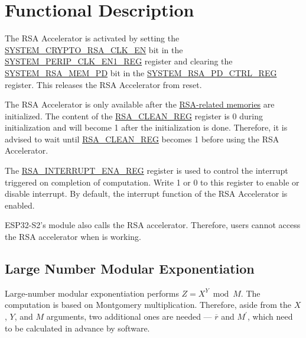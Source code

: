 \documentclass[main\_\_EN.tex]{subfiles}
\begin{document}
\section{Functional Description}


The RSA Accelerator is activated by setting the \hyperref[fielddesc:SYSTEMCRYPTORSACLKEN]{SYSTEM\_CRYPTO\_RSA\_CLK\_EN} bit in the \hyperref[regdesc:SYSTEMPERIPCLKEN1REG]{SYSTEM\_PERIP\_CLK\_EN1\_REG} register and clearing the \hyperref[fielddesc:SYSTEMRSAMEMPD]{SYSTEM\_RSA\_MEM\_PD} bit in the \hyperref[regdesc:SYSTEMRSAPDCTRLREG]{SYSTEM\_RSA\_PD\_CTRL\_REG} register. This releases the RSA Accelerator from reset.

The RSA Accelerator is only available after the \hyperref[Memorylist]{RSA-related memories} are initialized. The content of the \hyperref[regdesc:RSACLEANREG]{RSA\_CLEAN\_REG} register is 0 during initialization and will become 1 after the initialization is done. Therefore, it is advised to wait until \hyperref[regdesc:RSACLEANREG]{RSA\_CLEAN\_REG} becomes 1 before using the RSA Accelerator.

The \hyperref[regdesc:RSAINTERRUPTENAREG]{RSA\_INTERRUPT\_ENA\_REG} register is used to control the interrupt triggered on completion of computation. Write 1 or 0 to this register to enable or disable interrupt. By default, the interrupt function of the RSA Accelerator is enabled.

\begin{importantlisting}
\vspace{-0.5em}

    ESP32-S2's  module also calls the RSA accelerator. Therefore, users cannot access the RSA accelerator when  is working.
\end{importantlisting}

\subsection{Large Number Modular Exponentiation} \label{subsection:large_modular_Exponentiation}

Large-number modular exponentiation performs \begin{math}Z = X^{Y} \bmod M\end{math}. The computation is based on Montgomery multiplication. Therefore, aside from the \begin{math}X\end{math},
\begin{math}Y\end{math}, and
\begin{math}M\end{math} arguments, two additional ones are needed --- \begin{math}\overline{r}\end{math} and
\begin{math}M^{\prime}\end{math}, which need to be calculated in advance by software.
\end{document}
